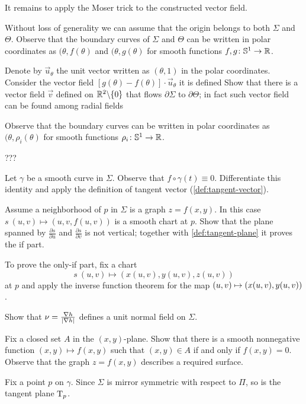 It remains to apply the Moser trick to the constructed vector field. 

Without loss of generality we can assume that the origin belongs to both $\Sigma$ and $\Theta$.
Observe that the boundary curves of $\Sigma$ and $\Theta$ can be written in polar coordinates as 
$(\theta, f(\theta)$ and $(\theta, g(\theta)$ for smooth functions $f,g\colon\mathbb{S}^1\to\mathbb{R}$.



Denote by $\vec u_\theta$ the unit vector written as $(\theta,1)$ in the polar coordinates.
Consider the vector field $[g(\theta)-f(\theta)]\cdot \vec u_\theta$ it is defined 
Show that there is a vector field $\vec v$ defined on $\mathbb{R}^2\backslash\{0\}$ that flows $\partial \Sigma$ to $\partial \Theta$;
in fact such vector field can be found among radial fields 


Observe that the boundary curves can be written in polar coordinates as 
$(\theta, \rho_i(\theta)$ for smooth functions $\rho_i\colon\mathbb{S}^1\to\mathbb{R}$.

???

Let $\gamma$ be a smooth curve in $\Sigma$.
Observe that $f\circ\gamma(t)\equiv 0$.
Differentiate this identity and apply the definition of tangent vector (\ref{def:tangent-vector}).

Assume a neighborhood of $p$ in $\Sigma$ is a graph $z=f(x,y)$.
In this case $s\:(u,v)\mapsto (u,v,f(u,v))$ is a smooth chart at $p$.
Show that the plane spanned by $\tfrac{\partial s}{\partial u}$ and $\tfrac{\partial s}{\partial v}$ is not vertical;
together with \ref{def:tangent-plane} it proves the if part.

To prove the only-if part, fix a chart 
\[s\:(u,v)\mapsto(x(u,v),y(u,v),z(u,v))\] at $p$ and apply the inverse function theorem for the map $(u,v)\z\mapsto(x(u,v),y(u,v))$.


 Show that $\nu=\tfrac{\nabla h}{|\nabla h|}$ defines a unit normal field on $\Sigma$.

Fix a closed set $A$ in the $(x,y)$-plane.
Show that there is a smooth nonnegative function $(x,y)\mapsto f(x,y)$ such that $(x,y)\in A$ if and only if $f(x,y)=0$.
Observe that the graph $z=f(x,y)$ describes a required surface.

Fix a point $p$ on $\gamma$.
Since $\Sigma$ is mirror symmetric with respect to $\Pi$,
so is the tangent plane $\mathrm{T}_p$.


